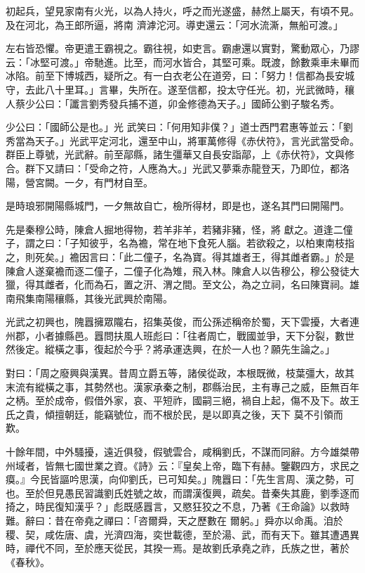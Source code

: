 \begin{pinyinscope}
 初起兵，望見家南有火光，以為人持火，呼之而光遂盛，赫然上屬天，有頃不見。及在河北，為王郎所逼，將南
 濟滹沱河。導吏還云：「河水流澌，無船可渡。」



 左右皆恐懼。帝更遣王霸視之。霸往視，如吏言。霸慮還以實對，驚動眾心，乃謬云：「冰堅可渡。」帝馳進。比至，而河水皆合，其堅可乘。既渡，餘數乘車未畢而冰陷。前至下博城西，疑所之。有一白衣老公在道旁，曰：「努力！信都為長安城守，去此八十里耳。」言畢，失所在。遂至信都，投太守任光。初，光武微時，穰人蔡少公曰：「讖言劉秀發兵捕不道，卯金修德為天子。」國師公劉子駿名秀。



 少公曰：「國師公是也。」光
 武笑曰：「何用知非僕？」道士西門君惠等並云：「劉秀當為天子。」光武平定河北，還至中山，將軍萬修得《赤伏符》，言光武當受命。群臣上尊號，光武辭。前至鄗縣，諸生彊華又自長安詣鄗，上《赤伏符》，文與修合。群下又請曰：「受命之符，人應為大。」光武又夢乘赤龍登天，乃即位，都洛陽，營宮闕。一夕，有門材自至。



 是時琅邪開陽縣城門，一夕無故自亡，檢所得材，即是也，遂名其門曰開陽門。



 先是秦穆公時，陳倉人掘地得物，若羊非羊，若豬非豬，怪，將
 獻之。道逢二僮子，謂之曰：「子知彼乎，名為襜，常在地下食死人腦。若欲殺之，以柏東南枝指之，則死矣。」襜因言曰：「此二僮子，名為寶。得其雄者王，得其雌者霸。」於是陳倉人遂棄襜而逐二僮子，二僮子化為雉，飛入林。陳倉人以告穆公，穆公發徒大獵，得其雌者，化而為石，置之汧、渭之間。至文公，為之立祠，名曰陳寶祠。雄南飛集南陽穰縣，其後光武興於南陽。



 光武之初興也，隗囂擁眾隴右，招集英俊，而公孫述稱帝於蜀，天下雲擾，大者連
 州郡，小者據縣邑。囂問扶風人班彪曰：「往者周亡，戰國並爭，天下分裂，數世然後定。縱橫之事，復起於今乎？將承運迭興，在於一人也？願先生論之。」



 對曰：「周之廢興與漢異。昔周立爵五等，諸侯從政，本根既微，枝葉彊大，故其末流有縱橫之事，其勢然也。漢家承秦之制，郡縣治民，主有專己之威，臣無百年之柄。至於成帝，假借外家，哀、平短祚，國嗣三絕，禍自上起，傷不及下。故王氏之貴，傾擅朝廷，能竊號位，而不根於民，是以即真之後，天下
 莫不引領而歎。



 十餘年間，中外騷擾，遠近俱發，假號雲合，咸稱劉氏，不謀而同辭。方今雄桀帶州域者，皆無七國世業之資。《詩》云：『皇矣上帝，臨下有赫。鑒觀四方，求民之瘼。』今民皆謳吟思漢，向仰劉氏，已可知矣。」隗囂曰：「先生言周、漢之勢，可也。至於但見愚民習識劉氏姓號之故，而謂漢復興，疏矣。昔秦失其鹿，劉季逐而掎之，時民復知漢乎？」彪既感囂言，又愍狂狡之不息，乃著《王命論》以救時難。辭曰：昔在帝堯之禪曰：「咨爾舜，天之歷數在
 爾躬。」舜亦以命禹。洎於稷、契，咸佐唐、虞，光濟四海，奕世載德，至於湯、武，而有天下。雖其遭遇異時，禪代不同，至於應天從民，其揆一焉。是故劉氏承堯之祚，氏族之世，著於《春秋》。




\end{pinyinscope}
